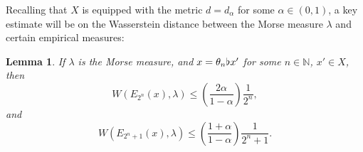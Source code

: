 \documentclass[reqno,11pt]{amsart}
\newtheorem{lem}[thm]{Lemma}
\theoremstyle{definition}
\theoremstyle{remark}
\theoremstyle{remark}
\def \N {\mathbb N}
\def\a{\alpha}
\def\b{\kern 0.02em \flat \kern 0.02em}
\numberwithin{equation}{section}
\begin{document}
Recalling that $X$ is equipped with the metric $d=d_\alpha$ for some $\alpha\in(0,1)$,
a key estimate will be on the Wasserstein distance between the Morse measure $\lambda$ and certain empirical measures:


\begin{lem}
If $\lambda$ is the Morse measure, and $x=\theta_n \b x'$ for some $n\in\N$, $x'\in X$, 
then
\begin{equation}\label{2_to_the_n}
W(E_{2^{n}}(x),\lambda)\le \left(\frac{2\a}{1-\a}\right) \frac{1}{2^{n}},
\end{equation}
and
\begin{equation}\label{2_to_the_n_plus_one}
W(E_{2^{n}+1}(x),\lambda)\le \left(\frac{1+\a}{1-\a}\right) \frac{1}{2^{n}+1}.
\end{equation}
\end{lem}
\end{document}
